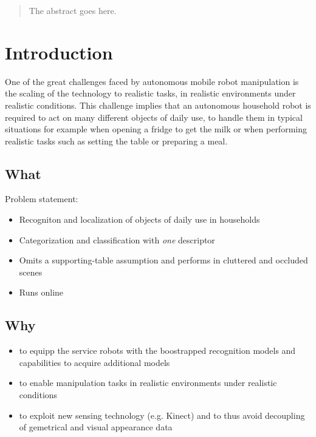\documentclass[conference]{sty/IEEEtran}
\begin{document}
\maketitle

\begin{abstract}
The abstract goes here.
\end{abstract}

\IEEEpeerreviewmaketitle

\section{Introduction}
One of the great challenges faced by autonomous mobile robot
manipulation is the scaling of the technology to realistic tasks, in
realistic environments under realistic conditions. This challenge
implies that an autonomous household robot is required to act on many
different objects of daily use, to handle them in typical situations
for example when opening a fridge to get the milk or when performing
realistic tasks such as setting the table or preparing a meal.

\subsection{What}
Problem statement:
\begin{itemize}
\item Recogniton and localization of objects of daily use in households
\item Categorization and classification with \emph{one} descriptor
\item Omits a supporting-table assumption and performs in cluttered and occluded scenes
\item Runs online
\end{itemize}


\subsection{Why}
\begin{itemize}
\item to equipp the service robots with the boostrapped recognition models and capabilities
to acquire additional models
\item to enable manipulation tasks in realistic environments under realistic conditions
\item to exploit new sensing technology (e.g. Kinect) and to thus avoid decoupling of gemetrical and
visual appearance data
\end{itemize}
\end{document}
